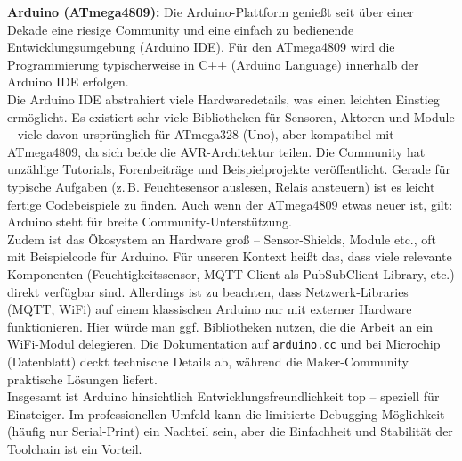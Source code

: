 \textbf{Arduino (ATmega4809):} Die Arduino-Plattform genießt seit über einer Dekade eine riesige Community und eine einfach zu bedienende Entwicklungsumgebung (Arduino IDE). \autocite{esp32_comparison} Für den ATmega4809 wird die Programmierung typischerweise in C++ (Arduino Language) innerhalb der Arduino IDE erfolgen. 
\\
Die Arduino IDE abstrahiert viele Hardwaredetails, was einen leichten Einstieg ermöglicht. Es existiert sehr viele Bibliotheken für Sensoren, Aktoren und Module – viele davon ursprünglich für ATmega328 (Uno), aber kompatibel mit ATmega4809, da sich beide die AVR-Architektur teilen. Die Community hat unzählige Tutorials, Forenbeiträge und Beispielprojekte veröffentlicht. \autocite{esp32_comparison} 
Gerade für typische Aufgaben (z.\,B. Feuchtesensor auslesen, Relais ansteuern) ist es leicht fertige Codebeispiele zu finden. Auch wenn der ATmega4809 etwas neuer ist, gilt: Arduino steht für breite Community-Unterstützung. 
\\
Zudem ist das Ökosystem an Hardware groß – Sensor-Shields, Module etc., oft mit Beispielcode für Arduino. Für unseren Kontext heißt das, dass viele relevante Komponenten (Feuchtigkeitssensor, MQTT-Client als PubSubClient-Library, etc.) direkt verfügbar sind. Allerdings ist zu beachten, dass Netzwerk-Libraries (MQTT, WiFi) auf einem klassischen Arduino nur mit externer Hardware funktionieren. Hier würde man ggf. Bibliotheken nutzen, die die Arbeit an ein WiFi-Modul delegieren. Die Dokumentation auf \texttt{arduino.cc} und bei Microchip (Datenblatt) deckt technische Details ab, während die Maker-Community praktische Lösungen liefert. 
\\
Insgesamt ist Arduino hinsichtlich Entwicklungsfreundlichkeit top – speziell für Einsteiger. Im professionellen Umfeld kann die limitierte Debugging-Möglichkeit (häufig nur Serial-Print) ein Nachteil sein, aber die Einfachheit und Stabilität der Toolchain ist ein Vorteil.


\vspace{5mm}

